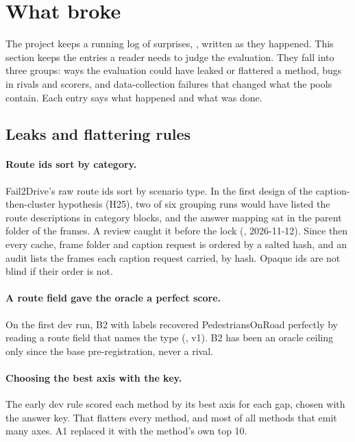 \section{What broke}
\label{sec:whatbroke}

The project keeps a running log of surprises, , written
as they happened. This section keeps the entries a reader needs to judge the
evaluation. They fall into three groups: ways the evaluation could have leaked
or flattered a method, bugs in rivals and scorers, and data-collection failures
that changed what the pools contain. Each entry says what happened and what was
done.

\subsection{Leaks and flattering rules}

\paragraph{Route ids sort by category.}
Fail2Drive's raw route ids sort by scenario type. In the first design of the
caption-then-cluster hypothesis (H25), two of six grouping runs would have
listed the route descriptions in category blocks, and the answer mapping sat in
the parent folder of the frames. A review caught it before the lock
(, 2026-11-12). Since then every cache, frame folder and
caption request is ordered by a salted hash, and an audit lists the frames each
caption request carried, by hash. Opaque ids are not blind if their order is not.

\paragraph{A route field gave the oracle a perfect score.}
On the first dev run, B2 with labels recovered PedestriansOnRoad perfectly by
reading a route field that names the type (, v1). B2 has been
an oracle ceiling only since the base pre-registration, never a rival.

\paragraph{Choosing the best axis with the key.}
The early dev rule scored each method by its best axis for each gap, chosen with
the answer key. That flatters every method, and most of all methods that emit
many axes. A1 replaced it with the method's own top 10.

